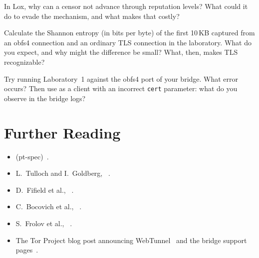 \begin{esercizio}[2]\label{es:16-lox}
In Lox, why can a censor not advance through reputation levels? What could it do to evade the mechanism, and what makes that costly?
\end{esercizio}

\begin{esercizio}[2]\label{es:16-entropia}
Calculate the Shannon entropy (in bits per byte) of the first 10\,KB captured from an obfs4 connection and an ordinary TLS connection in the laboratory. What do you expect, and why might the difference be small? What, then, makes TLS recognizable?
\end{esercizio}

\begin{esercizio}[3]\label{es:16-sondaggio-lab}
Try running Laboratory~1 against the obfs4 port of your bridge. What error occurs? Then use  as a client with an incorrect \texttt{cert} parameter: what do you observe in the bridge logs?
\end{esercizio}

\section*{Further Reading}
\begin{itemize}
  \item {} (pt-spec)~\cite{torspec}.
  \item L.~Tulloch and I.~Goldberg, ~\cite{tulloch2023lox}.
  \item D.~Fifield et al., ~\cite{fifield2015fronting}.
  \item C.~Bocovich et al., ~\cite{bocovich2024snowflake}.
  \item S.~Frolov et al., ~\cite{frolov2019conjure}.
  \item The Tor Project blog post announcing WebTunnel~\cite{torblogwebtunnel} and the bridge support pages~\cite{torsupport}.
\end{itemize}
